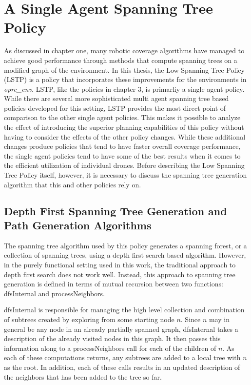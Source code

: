 \section{A Single Agent Spanning Tree Policy}

As discussed in chapter one, many robotic coverage algorithms have managed to achieve good performance through methods that compute spanning trees on a modified graph of the environment. In this thesis, the Low Spanning Tree Policy (LSTP) is a policy that incorporates these improvements for the environments in \textit{oprc\_env}. LSTP, like the policies in chapter 3, is primarliy a single agent policy. While there are several more sophisticated multi agent spanning tree based policies developed for this setting, LSTP provides the most direct point of comparison to the other single agent policies. This makes it possible to analyze the effect of introducing the superior planning capabilities of this policy without having to consider the effects of the other policy changes. While these additional changes produce policies that tend to have faster overall coverage performance, the single agent policies tend to have some of the best results when it comes to the efficient utilization of individual drones. Before describing the Low Spanning Tree Policy itself, however, it is necessary to discuss the spanning tree generation algorithm that this and other policies rely on.

\subsection{Depth First Spanning Tree Generation and Path Generation Algorithms}

The spanning tree algorithm used by this policy generates a spanning forest, or a collection of spanning trees, using a depth first search based algorithm. However, in the purely functional setting used in this work, the traditional approach to depth first search does not work well. Instead, this approach to spanning tree generation is defined in terms of mutual recursion between two functions: dfsInternal and processNeighbors.

dfsInternal is responsible for managing the high level collection and combination of subtrees created by exploring from some starting node $n$. Since $n$ may in general be any node in an already partially spanned graph, dfsInternal takes a description of the already visited nodes in this graph. It then passes this information along to a processNeighbors call for each of the children of $n$. As each of these computations returns, any subtrees are added to a local tree with $n$ as the root. In addition, each of these calls results in an updated description of the neighbors that has been added to the tree so far. 

